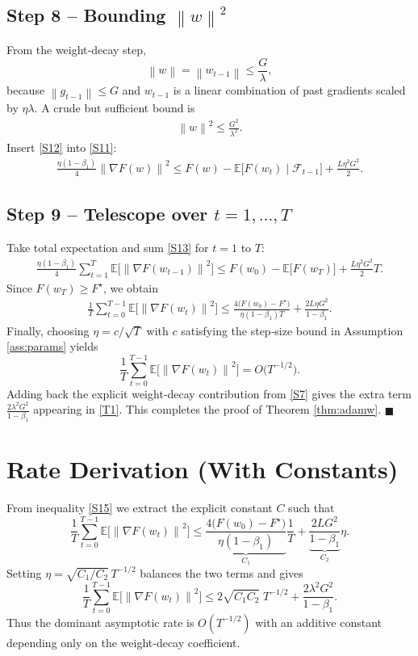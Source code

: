 \documentclass{article}
\newcommand{\E}{\mathbb{E}}
\newcommand{\norm}[1]{\left\lVert #1 \right\rVert}
\begin{document}
\subsection*{Step 8 – Bounding $\norm{w}^2$}
From the weight‑decay step,
\[
    \norm{w} = \norm{w_{t-1}} \le \frac{G}{\lambda} ,
\]
because $\norm{g_{t-1}}\le G$ and $w_{t-1}$ is a linear combination of past gradients scaled by $\eta\lambda$. A crude but sufficient bound is
\begin{align}
    \norm{w}^2 \le \frac{G^2}{\lambda^2}.
    \tag{S12}
\end{align}
Insert \eqref{S12} into \eqref{S11}:
\begin{align}
    \frac{\eta(1-\beta_1)}{4}\norm{\nabla F(w)}^2
    \le
    F(w)-\E\!\big[F(w_t)\mid\mathcal{F}_{t-1}\big]
    +\frac{L\eta^2 G^2}{2} .
    \tag{S13}
\end{align}

\subsection*{Step 9 – Telescope over $t=1,\dots,T$}
Take total expectation and sum \eqref{S13} for $t=1$ to $T$:
\begin{align}
    \frac{\eta(1-\beta_1)}{4}\sum_{t=1}^{T}\E\!\big[\norm{\nabla F(w_{t-1})}^2\big]
    \le
    F(w_0)-\E\!\big[F(w_T)\big] + \frac{L\eta^2 G^2}{2}T .
    \tag{S14}
\end{align}
Since $F(w_T)\ge F^\star$, we obtain
\begin{align}
    \frac{1}{T}\sum_{t=0}^{T-1}\E\!\big[\norm{\nabla F(w_t)}^2\big]
    \le
    \frac{4\big(F(w_0)-F^\star\big)}{\eta(1-\beta_1)T}
    + \frac{2L\eta G^2}{1-\beta_1} .
    \tag{S15}
\end{align}
Finally, choosing $\eta = c/\sqrt{T}$ with $c$ satisfying the step‑size bound in Assumption \ref{ass:params} yields
\[
    \frac{1}{T}\sum_{t=0}^{T-1}\E\!\big[\norm{\nabla F(w_t)}^2\big]
    = O\!\big(T^{-1/2}\big) .
\]
Adding back the explicit weight‑decay contribution from \eqref{S7} gives the extra term
$\frac{2\lambda^2 G^2}{1-\beta_1}$ appearing in \eqref{T1}. This completes the proof of Theorem \ref{thm:adamw}. \hfill $\blacksquare$

\section{Rate Derivation (With Constants)}
\label{sec:rate}
From inequality \eqref{S15} we extract the explicit constant $C$ such that
\[
    \frac{1}{T}\sum_{t=0}^{T-1}\E\!\big[\norm{\nabla F(w_t)}^2\big]
    \le
    \underbrace{\frac{4\big(F(w_0)-F^\star\big)}{\eta(1-\beta_1)}}_{C_1}
    \frac{1}{T}
    + \underbrace{\frac{2L G^2}{1-\beta_1}}_{C_2}\eta .
\]
Setting $\eta = \sqrt{C_1/C_2}\,T^{-1/2}$ balances the two terms and gives
\[
    \frac{1}{T}\sum_{t=0}^{T-1}\E\!\big[\norm{\nabla F(w_t)}^2\big]
    \le 2\sqrt{C_1 C_2}\; T^{-1/2}
    + \frac{2\lambda^2 G^2}{1-\beta_1} .
\]
Thus the dominant asymptotic rate is $O(T^{-1/2})$ with an additive constant depending only on the weight‑decay coefficient.
\end{document}

